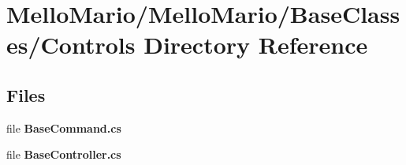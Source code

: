 \section{Mello\+Mario/\+Mello\+Mario/\+Base\+Classes/\+Controls Directory Reference}
\label{dir_81ea340dee7fdc7c519f2a163a923d5e}
\subsection*{Files}
\begin{DoxyCompactItemize}
\item 
file \textbf{ Base\+Command.\+cs}
\item 
file \textbf{ Base\+Controller.\+cs}
\end{DoxyCompactItemize}
